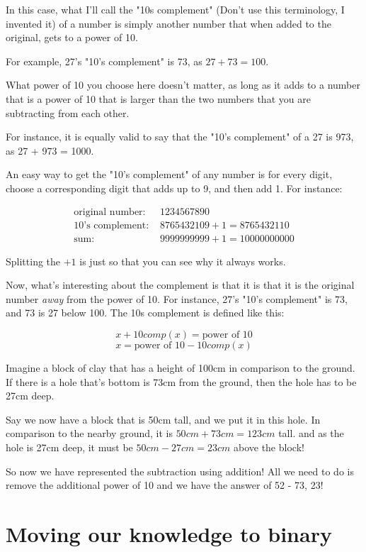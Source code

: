 \documentclass{article}
\begin{document}
  In this case, what I'll call the "10s complement" (Don't use this terminology, I invented it) of a number
  is simply another number that when added to the original, gets to a power of 10.

  For example, 27's "10's complement" is 73, as $27 + 73 = 100$.

  What power of 10 you choose here doesn't matter, as long as it adds to a number that is a power of 10
  that is larger than the two numbers that you are subtracting from each other.

  For instance, it is equally valid to say that the "10's complement" of a 27 is 973, as 27 + 973 = 1000.

  An easy way to get the "10's complement" of any number is for every digit, choose a corresponding digit
  that adds up to 9, and then add 1. For instance:

  \begin{align}
    \text{original number: } &1234567890 \nonumber \\
    \text{10's complement: } &8765432109 + 1 = 8765432110 \nonumber \\
    \text{sum: }             &9999999999 + 1 = 10000000000 \nonumber
  \end{align}

  Splitting the $+1$ is just so that you can see why it always works.

  Now, what's interesting about the complement is that it is that it is the original number \textit{away}
  from the power of 10. For instance, 27's "10's complement" is 73, and 73 is 27 below 100. The 10s complement
  is defined like this:

  \[ x + 10comp(x) = \text{power of 10} \]
  \[ x = \text{power of 10} - 10comp(x) \]
  
  Imagine a block of clay that has a height of 100cm in comparison to the ground. If there is a hole that's bottom
  is 73cm from the ground, then the hole has to be 27cm deep.

  Say we now have a block that is 50cm tall, and we put it in this hole. In comparison to the nearby ground, it is
  $50cm + 73cm = 123cm$ tall. and as the hole is 27cm deep, it must be $50cm - 27cm = 23cm$ above the block!

  So now we have represented the subtraction using addition! All we need to do is remove the additional power of 10 and we
  have the answer of 52 - 73, 23!

  \section{Moving our knowledge to binary}
\end{document}
